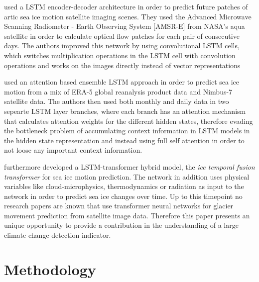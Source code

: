 \documentclass[12pt]{article}
\begin{document}
\citet{petrou2017prediction} used a LSTM encoder-decoder architecture \citep{srivastava2015unsupervised} in order to predict future patches of artic sea ice motion satellite imaging scenes. They used the Advanced Microwave Scanning Radiometer - Earth Observing System [AMSR-E] from NASA's aqua satellite in order to calculate optical flow patches for each pair of consecutive days. The authors improved this network by using convolutional LSTM cells, which switches multiplication operations in the LSTM cell with convolution operations and works on the images directly instead of vector representations \citep{petrou2019prediction} 

\citet{ali2021sea} used an attention based ensemble LSTM approach in order to predict sea ice motion from a mix of ERA-5 global reanalysis product data and Nimbus-7 satellite data. The authors then used both monthly and daily data in two sepearte LSTM layer branches, where each branch has an attention mechanism that calculates attention weights for the different hidden states, therefore evading the bottleneck problem of accumulating context information in LSTM models in the hidden state representation and instead using full self attention in order to not loose any important context information.   

\citet{mu2023icetft} furthermore developed a LSTM-transformer hybrid model, the \textit{ice temporal fusion transformer} for sea ice motion prediction. The network in addition uses physical variables like cloud-microphysics, thermodynamics or radiation as input to the network in order to predict sea ice changes over time. Up to this timepoint no research papers are known that use transformer neural networks for glacier movement prediction from satellite image data. Therefore this paper presents an unique opportunity to provide a contribution in the understanding of a large climate change detection indicator. 

\section{Methodology}
\end{document}
